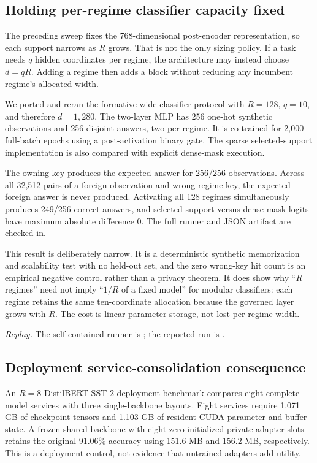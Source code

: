 \documentclass[11pt]{article}
\begin{document}
\subsection{Holding per-regime classifier capacity fixed}

The preceding sweep fixes the 768-dimensional post-encoder representation, so
each support narrows as $R$ grows. That is not the only sizing policy. If a task
needs $q$ hidden coordinates per regime, the architecture may instead choose
$d=qR$. Adding a regime then adds a block without reducing any incumbent
regime's allocated width.

We ported and reran the formative wide-classifier protocol with $R=128$,
$q=10$, and therefore $d=1{,}280$. The two-layer MLP has 256 one-hot synthetic
observations and 256 disjoint answers, two per regime. It is co-trained for
2,000 full-batch epochs using a post-activation binary gate. The sparse
selected-support implementation is also compared with explicit dense-mask
execution.

The owning key produces the expected answer for 256/256 observations. Across
all 32,512 pairs of a foreign observation and wrong regime key, the expected
foreign answer is never produced. Activating all 128 regimes simultaneously
produces 249/256 correct answers, and selected-support versus dense-mask logits
have maximum absolute difference 0. The full runner and JSON artifact are
checked in.

This result is deliberately narrow. It is a deterministic synthetic
memorization and scalability test with no held-out set, and the zero wrong-key
hit count is an empirical negative control rather than a privacy theorem. It
does show why ``$R$ regimes'' need not imply ``$1/R$ of a fixed model'' for
modular classifiers: each regime retains the same ten-coordinate allocation
because the governed layer grows with $R$. The cost is linear parameter storage,
not lost per-regime width.

\noindent\textit{Replay.} The self-contained runner is
; the reported run is
.

\subsection{Deployment service-consolidation consequence}

An $R=8$ DistilBERT SST-2 deployment benchmark compares eight complete model
services with three single-backbone layouts. Eight services require 1.071 GB
of checkpoint tensors and 1.103 GB of resident CUDA parameter and buffer
state. A frozen shared backbone with eight zero-initialized private adapter
slots retains the original 91.06\% accuracy using 151.6 MB and 156.2 MB,
respectively. This is a deployment control, not evidence that untrained
adapters add utility.
\end{document}
